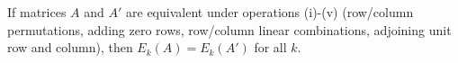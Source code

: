 If matrices $A$ and $A'$ are equivalent under operations (i)-(v) (row/column permutations, adding zero rows, row/column linear combinations, adjoining unit row and column), then $E_k(A) = E_k(A')$ for all $k$.
